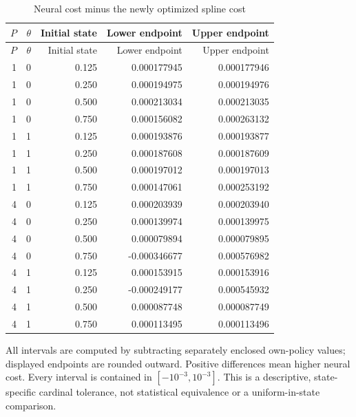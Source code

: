 \begin{longtable}{rrrrr}
\caption{Neural cost minus the newly optimized spline cost}\label{tab:r41difference}\\\toprule
$P$ & $\theta$ & Initial state & Lower endpoint & Upper endpoint\\\midrule\endfirsthead
\toprule $P$ & $\theta$ & Initial state & Lower endpoint & Upper endpoint\\\midrule\endhead
1 & 0 & 0.125 & 0.000177945 & 0.000177946\\
1 & 0 & 0.250 & 0.000194975 & 0.000194976\\
1 & 0 & 0.500 & 0.000213034 & 0.000213035\\
1 & 0 & 0.750 & 0.000156082 & 0.000263132\\
1 & 1 & 0.125 & 0.000193876 & 0.000193877\\
1 & 1 & 0.250 & 0.000187608 & 0.000187609\\
1 & 1 & 0.500 & 0.000197012 & 0.000197013\\
1 & 1 & 0.750 & 0.000147061 & 0.000253192\\
4 & 0 & 0.125 & 0.000203939 & 0.000203940\\
4 & 0 & 0.250 & 0.000139974 & 0.000139975\\
4 & 0 & 0.500 & 0.000079894 & 0.000079895\\
4 & 0 & 0.750 & -0.000346677 & 0.000576982\\
4 & 1 & 0.125 & 0.000153915 & 0.000153916\\
4 & 1 & 0.250 & -0.000249177 & 0.000545932\\
4 & 1 & 0.500 & 0.000087748 & 0.000087749\\
4 & 1 & 0.750 & 0.000113495 & 0.000113496\\
\bottomrule\end{longtable}
All intervals are computed by subtracting separately enclosed own-policy values; displayed endpoints are rounded outward. Positive differences mean higher neural cost. Every interval is contained in $[-10^{-3},10^{-3}]$. This is a descriptive, state-specific cardinal tolerance, not statistical equivalence or a uniform-in-state comparison.
